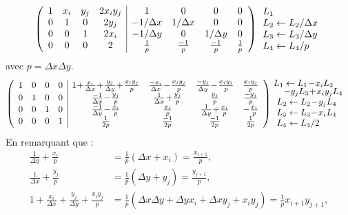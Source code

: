 \documentclass[main.tex]{subfiles}
\begin{document}
$$\medmuskip=1mu \left( \begin{array}{cccc|cccc}
1 & x_i & y_j & 2 x_i y_j & 1 & 0 & 0 & 0\\
0 &  1 & 0 & 2 y_j   & -1/\Delta x & 1/\Delta x & 0 & 0\\
0 & 0  &  1 & 2x_i  & -1/\Delta y & 0 & 1/\Delta y & 0 \\
0 & 0 & 0 & 2 & \frac{1}{p} & \frac{-1}{p} & \frac{-1}{p}& \frac{1}{p}
\end{array}\right) \begin{array}{l}
L_1 \\
L_2 \leftarrow L_2  / \Delta x \\
L_3 \leftarrow L_3/ \Delta y \\
L_4 \leftarrow  L_4 / p
\end{array}  $$
avec $p=\Delta x\Delta y$.
$$\medmuskip=1mu \left( \begin{array}{cccc|cccc}
1 & 0 & 0 & 0 & 1+ \frac{x_i}{\Delta x} + \frac{y_j}{\Delta y} + \frac{x_iy_j}{p} & \frac{-x_i}{\Delta x}- \frac{x_iy_j}{p} & \frac{-y_j}{\Delta y}- \frac{x_iy_j}{p} & \frac{x_iy_j}{p}\\
0 &  1 & 0 & 0   & \frac{-1}{\Delta x} - \frac{y_j}{p} & \frac{1}{\Delta x} + \frac{y_j}{p} &  \frac{y_j}{p} & \frac{-y_j}{p}\\
0 & 0  &  1 & 0  & \frac{-1}{\Delta y} - \frac{x_i}{p} & \frac{x_i}{p} & \frac{1}{\Delta y} + \frac{x_i}{p} & - \frac{x_i}{p} \\
0 & 0 & 0 & 1 & \frac{1}{2p} & \frac{-1}{2p} & \frac{-1}{2p}& \frac{1}{2p}
\end{array}\right) 
\begin{array}{l}
\hspace{-3mm}\begin{array}{l}
L_1 \leftarrow  L_1-x_iL_2 \vspace{-1mm}\\ \hspace{4mm}  - y_j L_3 +x_iy_j L_4
\end{array} \\
L_2 \leftarrow L_2 -y_j L_4 \\
L_3 \leftarrow L_3 - x_i L_4 \\
L_4 \leftarrow L_4 /2
\end{array} \\
$$
En remarquant que :
\begin{align*}
\frac{1}{\Delta y} + \frac{x_i}{p} &= \frac{1}{p} (\Delta x + x_i) = \frac{x_{i+1}}{p}, \\
\frac{1}{\Delta x} + \frac{y_j}{p} &= \frac{1}{p} (\Delta y + y_j) = \frac{y_{j+1}}{p}, \\
 1+ \frac{x_i}{\Delta x} + \frac{y_j}{\Delta y} + \frac{x_iy_j}{p} & = \frac{1}{p}( \Delta x \Delta y + \Delta y x_i + \Delta x y_j + x_i y_j ) = \frac{1}{p} x_{i+1}y_{j+1},
\end{align*}
\end{document}
